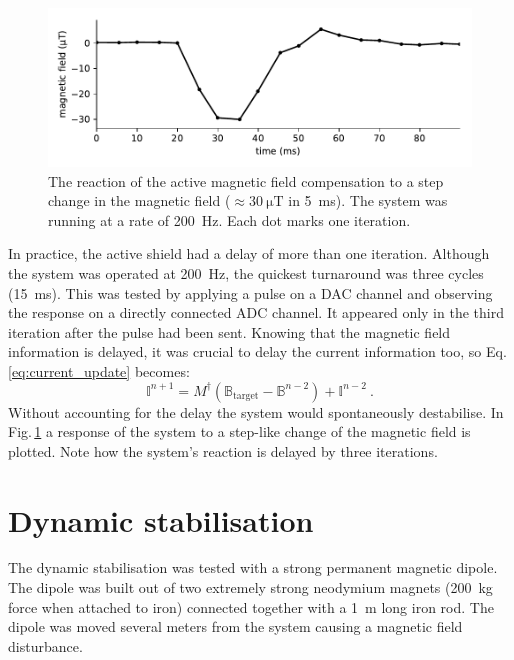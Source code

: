 \begin{figure}
  \centering
  \includegraphics[width=.9\linewidth]{gfx/prototype/SFC_step_response.pdf}
  \caption{The reaction of the active magnetic field compensation to a step change in the magnetic field ($\approx \SI{30}{\micro\tesla}$ in \SI{5}{\milli\second}). The system was running at a rate of \SI{200}{\hertz}. Each dot marks one iteration.}\label{fig:prototype_step_response}
\end{figure}

In practice, the active shield had a delay of more than one iteration.
Although the system was operated at \SI{200}{\hertz}, the quickest turnaround was three cycles (\SI{15}{\milli\second}).
This was tested by applying a pulse on a DAC channel and observing the response on a directly connected ADC channel.
It appeared only in the third iteration after the pulse had been sent.
Knowing that the magnetic field information is delayed, it was crucial to delay the current information too, so Eq.\,\ref{eq:current_update} becomes:
\begin{equation}
  \mathbb{I}^{n+1} = M^\dagger \left( \mathbb{B}_\text{target} - \mathbb{B}^{n-2} \right) + \mathbb{I}^{n-2} \ .
\end{equation}
Without accounting for the delay the system would spontaneously destabilise.
In Fig.\,\ref{fig:prototype_step_response} a response of the system to a step-like change of the magnetic field is plotted.
Note how the system's reaction is delayed by three iterations.




\section{Dynamic stabilisation}
\label{sec:dynamic_stabilisation}
The dynamic stabilisation was tested with a strong permanent magnetic dipole.
The dipole was built out of two extremely strong neodymium magnets (\SI{200}{\kilo\gram} force when attached to iron) connected together with a \SI{1}{\metre} long iron rod.
The dipole was moved several meters from the system causing a magnetic field disturbance.

